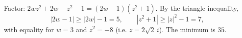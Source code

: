 Factor: $2wz^2+2w-z^2-1=(2w-1)(z^2+1)$. By the triangle inequality,
\[|2w-1|\ge|2w|-1=5,\qquad|z^2+1|\ge|z|^2-1=7,\]
with equality for $w=3$ and $z^2=-8$ (i.e. $z=2\sqrt2\,i$). The minimum is $\boxed{35}$.
